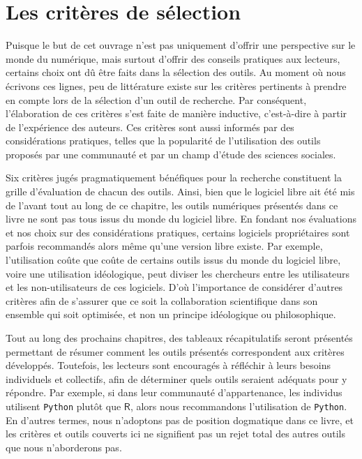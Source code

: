 \documentclass[
  letterpaper,
  DIV=11,
  numbers=noendperiod,
  oneside]{scrreprt}
\begin{document}
\hypertarget{les-crituxe8res-de-suxe9lection}{%
\section{Les critères de
sélection}\label{les-crituxe8res-de-suxe9lection}}

Puisque le but de cet ouvrage n'est pas uniquement d'offrir une
perspective sur le monde du numérique, mais surtout d'offrir des
conseils pratiques aux lecteurs, certains choix ont dû être faits dans
la sélection des outils. Au moment où nous écrivons ces lignes, peu de
littérature existe sur les critères pertinents à prendre en compte lors
de la sélection d'un outil de recherche. Par conséquent, l'élaboration
de ces critères s'est faite de manière inductive, c'est-à-dire à partir
de l'expérience des auteurs. Ces critères sont aussi informés par des
considérations pratiques, telles que la popularité de l'utilisation des
outils proposés par une communauté et par un champ d'étude des sciences
sociales.

Six critères jugés pragmatiquement bénéfiques pour la recherche
constituent la grille d'évaluation de chacun des outils. Ainsi, bien que
le logiciel libre ait été mis de l'avant tout au long de ce chapitre,
les outils numériques présentés dans ce livre ne sont pas tous issus du
monde du logiciel libre. En fondant nos évaluations et nos choix sur des
considérations pratiques, certains logiciels propriétaires sont parfois
recommandés alors même qu'une version libre existe. Par exemple,
l'utilisation coûte que coûte de certains outils issus du monde du
logiciel libre, voire une utilisation idéologique, peut diviser les
chercheurs entre les utilisateurs et les non-utilisateurs de ces
logiciels. D'où l'importance de considérer d'autres critères afin de
s'assurer que ce soit la collaboration scientifique dans son ensemble
qui soit optimisée, et non un principe idéologique ou philosophique.

Tout au long des prochains chapitres, des tableaux récapitulatifs seront
présentés permettant de résumer comment les outils présentés
correspondent aux critères développés. Toutefois, les lecteurs sont
encouragés à réfléchir à leurs besoins individuels et collectifs, afin
de déterminer quels outils seraient adéquats pour y répondre. Par
exemple, si dans leur communauté d'appartenance, les individus utilisent
\texttt{Python} plutôt que \(\textsf{R}\), alors nous recommandons
l'utilisation de \texttt{Python}. En d'autres termes, nous n'adoptons
pas de position dogmatique dans ce livre, et les critères et outils
couverts ici ne signifient pas un rejet total des autres outils que nous
n'aborderons pas.
\end{document}
